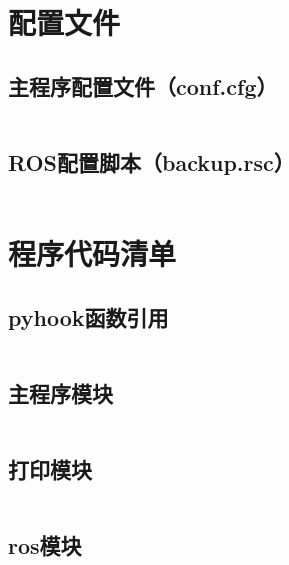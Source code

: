 \chapter{配置文件}
\section{主程序配置文件（conf.cfg）}
\label{cha:conf.cfg-1}

\inputminted{python}{../src/conf.cfg}


\section{ROS配置脚本（backup.rsc）}
\label{sec:ros-script}

\inputminted{bash}{../src/backup.rsc}

\chapter{程序代码清单}

\section{pyhook函数引用}
\label{sec:pyhook}

\inputminted[fontsize=\small,
  linenos=true,numbersep=2pt,
  frame=leftline,framesep=3pt,rulecolor=\color{lightgray},
  xleftmargin=10pt
  ]{python}{../src/pyHook/Hook.py}

\section{主程序模块}

\inputminted[fontsize=\small,
  linenos=true,numbersep=2pt,
  frame=leftline,framesep=3pt,rulecolor=\color{lightgray},
  xleftmargin=10pt
  ]{python}{../src/rasp.py}

\section{打印模块}

\inputminted[fontsize=\small,
  linenos=true,numbersep=2pt,
  frame=leftline,framesep=3pt,rulecolor=\color{lightgray},
  xleftmargin=10pt
  ]{python}{../src/rasprint.py}

\section{ros模块}

